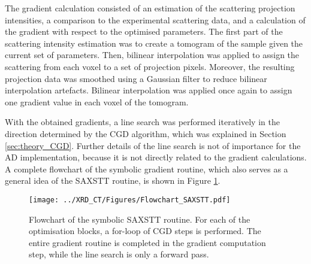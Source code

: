 The gradient calculation consisted of an estimation of the scattering projection intensities, a comparison to the experimental scattering data,
and a calculation of the gradient with respect to the optimised parameters.
The first part of the scattering intensity estimation was to create a tomogram of the sample given the current set of parameters.
Then, bilinear interpolation was applied to assign the scattering from each voxel to a set of projection pixels.
Moreover, the resulting projection data was smoothed using a Gaussian filter to reduce bilinear interpolation artefacts.
Bilinear interpolation was applied once again to assign one gradient value in each voxel of the tomogram. %

With the obtained gradients, a line search was performed iteratively in the direction determined by the CGD algorithm, which was explained in Section \ref{sec:theory_CGD}.
Further details of the line search is not of importance for the AD implementation, because it is not directly related to the gradient calculations.
A complete flowchart of the symbolic gradient routine, which also serves as a general idea of the SAXSTT routine, is shown in Figure \ref{fig:flowchart_SAXSTT}.



\begin{figure}
    \centering
    \texttt{[image: ../XRD\_CT/Figures/Flowchart\_SAXSTT.pdf]} %
    \caption{Flowchart of the symbolic SAXSTT routine.
        For each of the optimisation blocks, a for-loop of CGD steps is performed.
        The entire gradient routine is completed in the gradient computation step, while the line search is only a forward pass.
    }
    \label{fig:flowchart_SAXSTT}
\end{figure}

